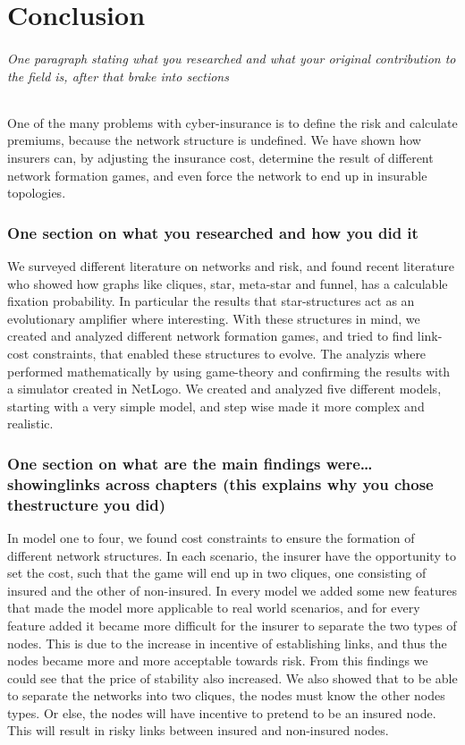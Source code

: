 \chapter{Conclusion}
\subparagraph{One paragraph stating what you researched and what your original contribution to the field is, after that brake into sections}
One of the many problems with cyber-insurance is to define the risk and calculate premiums, because the network structure is undefined. We have shown how insurers can, by adjusting the insurance cost, determine the result of different network formation games, and even force the network to end up in insurable topologies.  
\subsection{One section on what you researched and how you did it}
We surveyed different literature on networks and risk, and found recent literature who showed how graphs like cliques, star, meta-star and funnel, has a calculable fixation probability. In particular the results that star-structures act as an evolutionary amplifier where interesting. 
With these structures in mind, we created and analyzed different network formation games, and tried to find link-cost constraints, that enabled these structures to evolve. 
The analyzis where performed mathematically by using game-theory and confirming the results with a simulator created in NetLogo.
We created and analyzed five different models, starting with a very simple model, and step wise made it more complex and realistic. 
\subsection{One section on what are the main findings were… showinglinks across chapters (this explains why you chose thestructure you did)}
In model one to four, we found cost constraints to ensure the formation of different network structures. In each scenario, the insurer have the opportunity to set the cost, such that the game will end up in two cliques, one consisting of insured and the other of non-insured. 
In every model we added some new features that made the model more applicable to real world scenarios, and for every feature added it became more difficult for the insurer to separate the two types of nodes. This is due to the increase in incentive of establishing links, and thus the nodes became more and more acceptable towards risk. From this findings we could see that the price of stability also increased. 
We also showed that to be able to separate the networks into two cliques, the nodes must know the other nodes types. Or else, the nodes will have incentive to pretend to be an insured node. This will result in risky links between insured and non-insured nodes. 

